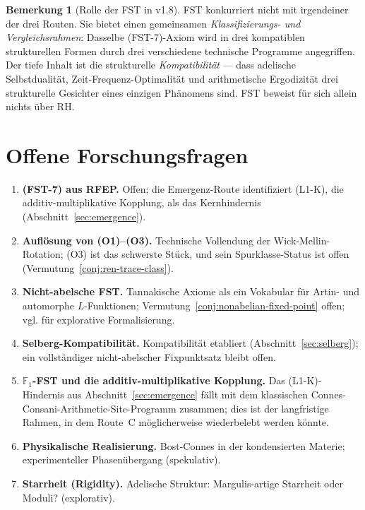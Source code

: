 \documentclass[11pt,a4paper]{article}
\theoremstyle{plain}
\theoremstyle{definition}
\newtheorem{remark}[theorem]{Bemerkung}
\newcommand{\F}{\mathbb{F}}
\begin{document}
\begin{remark}[Rolle der FST in v1.8]\label{rem:fst-role-v07}
FST konkurriert nicht mit irgendeiner der drei Routen. Sie bietet einen
gemeinsamen \emph{Klassifizierungs- und Vergleichsrahmen}: Dasselbe
(FST-7)-Axiom wird in drei kompatiblen strukturellen Formen durch drei
verschiedene technische Programme angegriffen. Der tiefe Inhalt ist die
strukturelle \emph{Kompatibilität} --- dass adelische Selbstdualität,
Zeit-Frequenz-Optimalität und arithmetische Ergodizität drei
strukturelle Gesichter eines einzigen Phänomens sind. FST beweist
für sich allein nichts über RH.
\end{remark}

\section{Offene Forschungsfragen}
\label{sec:ofq}

\begin{enumerate}[label=(OFQ\arabic*),leftmargin=*]
\item \textbf{(FST-7) aus RFEP.} Offen; die Emergenz-Route
  identifiziert (L1-K), die additiv-multiplikative Kopplung, als das
  Kernhindernis (Abschnitt~\ref{sec:emergence}).
\item \textbf{Auflösung von (O1)--(O3).} Technische
  Vollendung der Wick-Mellin-Rotation; (O3) ist das schwerste Stück,
  und sein Spurklasse-Status ist offen (Vermutung~\ref{conj:ren-trace-class}).
\item \textbf{Nicht-abelsche FST.} Tannakische Axiome als ein
  Vokabular für Artin- und automorphe $L$-Funktionen;
  Vermutung~\ref{conj:nonabelian-fixed-point} offen;
  vgl. \cite{TannakianAxioms} für explorative Formalisierung.
\item \textbf{Selberg-Kompatibilität.} Kompatibilität
  etabliert (Abschnitt~\ref{sec:selberg}); ein vollständiger nicht-abelscher
  Fixpunktsatz bleibt offen.
\item \textbf{$\F_1$-FST und die additiv-multiplikative Kopplung.}
  Das (L1-K)-Hindernis aus Abschnitt~\ref{sec:emergence} fällt mit dem
  klassischen Connes-Consani-Arithmetic-Site-Programm zusammen;
  dies ist der langfristige Rahmen, in dem Route~C möglicherweise
  wiederbelebt werden könnte.
\item \textbf{Physikalische Realisierung.} Bost-Connes in der
  kondensierten Materie; experimenteller Phasenübergang (spekulativ).
\item \textbf{Starrheit (Rigidity).} Adelische Struktur:
  Margulis-artige Starrheit oder Moduli? (explorativ).
\end{enumerate}
\end{document}
